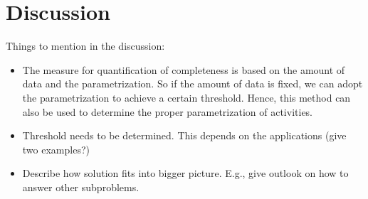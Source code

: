 \section{Discussion}
\label{sec:discussion}

\color{red}

Things to mention in the discussion:
\begin{itemize}
	\item The measure for quantification of completeness is based on the amount of data and the parametrization. So if the amount of data is fixed, we can adopt the parametrization to achieve a certain threshold. Hence, this method can also be used to determine the proper parametrization of activities.
	\item Threshold needs to be determined. This depends on the applications (give two examples?)
	\item Describe how solution fits into bigger picture. E.g., give outlook on how to answer other subproblems.
\end{itemize}

\color{black}

